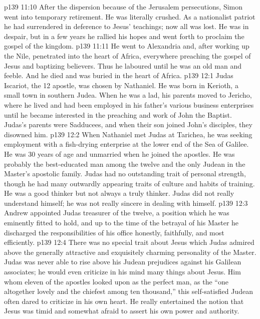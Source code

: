 \vs p139 11:10 \pc After the dispersion because of the Jerusalem persecutions, Simon went into temporary retirement. He was literally crushed. As a nationalist patriot he had surrendered in deference to Jesus’ teachings; now all was lost. He was in despair, but in a few years he rallied his hopes and went forth to proclaim the gospel of the kingdom.
\vs p139 11:11 He went to Alexandria and, after working up the Nile, penetrated into the heart of Africa, everywhere preaching the gospel of Jesus and baptizing believers. Thus he laboured until he was an old man and feeble. And he died and was buried in the heart of Africa.
\vs p139 12:1 Judas Iscariot, the 12 apostle, was chosen by Nathaniel. He was born in Kerioth, a small town in southern Judea. When he was a lad, his parents moved to Jericho, where he lived and had been employed in his father’s various business enterprises until he became interested in the preaching and work of John the Baptist. Judas’s parents were Sadducees, and when their son joined John’s disciples, they disowned him.
\vs p139 12:2 \pc When Nathaniel met Judas at Tarichea, he was seeking employment with a fish\hyp{}drying enterprise at the lower end of the Sea of Galilee. He was 30 years of age and unmarried when he joined the apostles. He was probably the best\hyp{}educated man among the twelve and the only Judean in the Master’s apostolic family. Judas had no outstanding trait of personal strength, though he had many outwardly appearing traits of culture and habits of training. He was a good thinker but not always a truly  thinker. Judas did not really understand himself; he was not really sincere in dealing with himself.
\vs p139 12:3 Andrew appointed Judas treasurer of the twelve, a position which he was eminently fitted to hold, and up to the time of the betrayal of his Master he discharged the responsibilities of his office honestly, faithfully, and most efficiently.
\vs p139 12:4 \pc There was no special trait about Jesus which Judas admired above the generally attractive and exquisitely charming personality of the Master. Judas was never able to rise above his Judean prejudices against his Galilean associates; he would even criticize in his mind many things about Jesus. Him whom eleven of the apostles looked upon as the perfect man, as the “one altogether lovely and the chiefest among ten thousand,” this self\hyp{}satisfied Judean often dared to criticize in his own heart. He really entertained the notion that Jesus was timid and somewhat afraid to assert his own power and authority.
